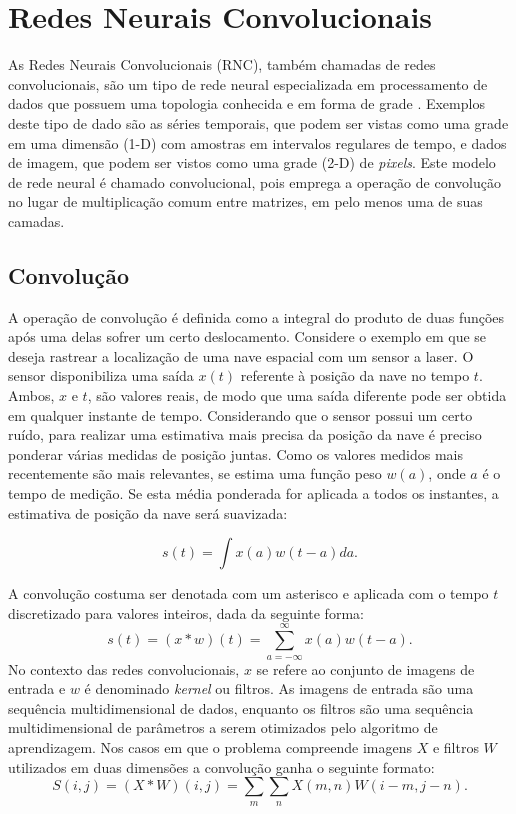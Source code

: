 \section{Redes Neurais Convolucionais}
As Redes Neurais Convolucionais (RNC), também chamadas de redes convolucionais,
são um tipo de rede neural especializada em processamento de dados que possuem uma
topologia conhecida e em forma de grade \citep{Gdfl16}. Exemplos deste tipo de dado são as séries
temporais, que podem ser vistas como uma grade em uma dimensão (1-D) com amostras
em intervalos regulares de tempo, e dados de imagem, que podem ser vistos como
uma grade (2-D) de \textit{pixels}. Este modelo de rede neural é chamado convolucional,
pois emprega a operação de convolução no lugar de multiplicação comum entre matrizes,
em pelo menos uma de suas camadas.

\subsection{Convolução}
A operação de convolução é definida como a integral do produto de duas funções após uma delas sofrer um
certo deslocamento. Considere o exemplo em que se deseja rastrear a localização de uma
nave espacial com um sensor a laser. O sensor disponibiliza uma saída $x(t)$ referente à posição da nave
no tempo $t$. Ambos, $x$ e $t$, são valores reais, de modo que uma saída diferente pode ser obtida
em qualquer instante de tempo. Considerando que o sensor possui um certo ruído, para realizar uma
estimativa mais precisa da posição da nave é preciso ponderar várias medidas de posição juntas.
Como os valores medidos mais recentemente são mais relevantes, se estima uma função peso
$w(a)$, onde $a$ é o tempo de medição. Se esta média ponderada for aplicada a todos os instantes,
a estimativa de posição da nave será suavizada:

\begin{equation}
 s(t) = \int{x(a) w(t-a)da}.
 \label{eq:1}
\end{equation}

A convolução costuma ser denotada com um asterisco e aplicada com o tempo $t$ discretizado para valores inteiros,
dada da seguinte forma:
\begin{equation}
 s(t) = (x * w)(t) = \sum_{a=-\infty}^{\infty}{x(a)w(t-a)}.
 \label{eq:2}
\end{equation}
No contexto das redes convolucionais, $x$ se refere ao conjunto de imagens de entrada 
e $w$ é denominado \textit{kernel} ou filtros. As imagens de entrada são uma sequência multidimensional 
de dados, enquanto os filtros são uma sequência multidimensional de parâmetros a serem 
otimizados pelo algoritmo de aprendizagem.
Nos casos em que o problema compreende imagens $X$ e filtros $W$ utilizados em duas dimensões 
a convolução ganha o seguinte formato:
\begin{equation}
 S(i,j) = (X*W)(i,j) = \sum_{m}\sum_{n}{X(m,n)W(i-m,j-n)}.
\end{equation}


